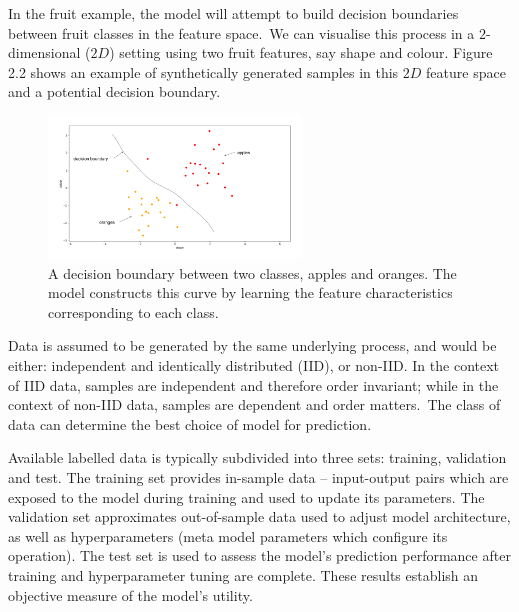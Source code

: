 \noindent In the fruit example, the model will attempt to build decision boundaries between fruit classes in the feature space.\ We can visualise this process in a $2$-dimensional ($ 2D $) setting using two fruit features, say shape and colour. Figure 2.2 shows an example of synthetically generated samples in this $ 2D $ feature space and a potential decision boundary.

\begin{figure}[H]
   	\centering
    	\includegraphics[width=0.6\textwidth, height=0.4\textwidth]{oranges_and_apples_decision_boundary}
	\captionsetup{justification=centering}
	\caption{A decision boundary between two classes, apples and oranges. The model constructs this curve by learning the feature characteristics corresponding to each class.}
\end{figure}

\noindent Data is assumed to be generated by the same underlying process, and would be either: independent and identically distributed (IID), or non-IID. In the context of IID data, samples are independent and therefore order invariant; while in the context of non-IID data, samples are dependent and order matters.\ The class of data can determine the best choice of model for prediction. \par

\noindent Available labelled data is typically subdivided into three sets: training, validation and test. The training set provides in-sample data -- input-output pairs which are exposed to the model during training and used to update its parameters. The validation set approximates out-of-sample data used to adjust model architecture, as well as hyperparameters (meta model parameters which configure its operation). The test set is used to assess the model's prediction performance after training and hyperparameter tuning are complete. These results establish an objective measure of the model's utility.  \par

